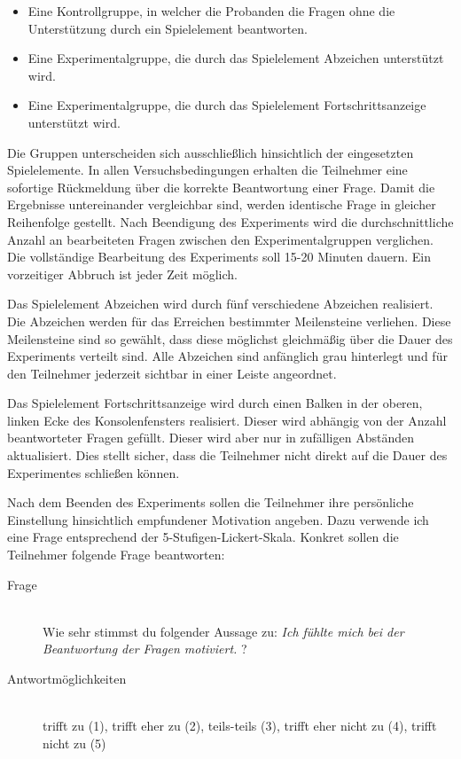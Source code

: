 \documentclass[
    a4paper,
    doc,
    12pt,
    natbib,
]{apa6}
\begin{document}
\begin{itemize}
    \item Eine Kontrollgruppe, in welcher die Probanden die Fragen ohne die Unterstützung durch ein Spielelement beantworten. 
    \item  Eine Experimentalgruppe, die durch das Spielelement Abzeichen unterstützt wird.
    \item  Eine Experimentalgruppe, die durch das Spielelement Fortschrittsanzeige unterstützt wird. 
\end{itemize}

Die Gruppen unterscheiden sich ausschließlich hinsichtlich der eingesetzten Spielelemente.
In allen Versuchsbedingungen erhalten die Teilnehmer eine sofortige Rückmeldung über die korrekte Beantwortung einer Frage. Damit die Ergebnisse untereinander vergleichbar sind, werden identische Frage in gleicher Reihenfolge gestellt.
Nach Beendigung des Experiments wird die durchschnittliche Anzahl an  bearbeiteten Fragen zwischen den Experimentalgruppen verglichen. Die vollständige Bearbeitung des Experiments soll 15-20 Minuten dauern. Ein vorzeitiger Abbruch ist jeder Zeit möglich.

Das Spielelement Abzeichen wird durch fünf verschiedene Abzeichen realisiert. Die Abzeichen werden für das Erreichen bestimmter Meilensteine verliehen. Diese Meilensteine sind so gewählt, dass diese möglichst gleichmäßig über die Dauer des Experiments verteilt sind. Alle Abzeichen sind anfänglich grau hinterlegt und für den Teilnehmer jederzeit sichtbar in einer Leiste angeordnet.

Das Spielelement Fortschrittsanzeige wird durch einen Balken in der oberen, linken Ecke des Konsolenfensters realisiert. Dieser wird abhängig von der Anzahl beantworteter Fragen gefüllt. Dieser wird aber nur in zufälligen Abständen aktualisiert. Dies stellt sicher, dass die Teilnehmer nicht direkt auf die Dauer des Experimentes schließen können.

Nach dem Beenden des Experiments sollen die Teilnehmer ihre persönliche Einstellung hinsichtlich empfundener Motivation angeben. Dazu verwende ich eine Frage entsprechend der 5-Stufigen-Lickert-Skala. Konkret sollen die Teilnehmer folgende Frage beantworten:

\begin{description}
\item[Frage]\hfill \\ Wie sehr stimmst du folgender Aussage zu: \textit{Ich fühlte mich bei der Beantwortung der Fragen motiviert.} ?
\item[Antwortmöglichkeiten]\hfill \\ trifft zu (1), trifft eher zu (2), teils-teils (3), trifft eher nicht zu (4), trifft nicht zu (5)
\end{description}
\end{document}
